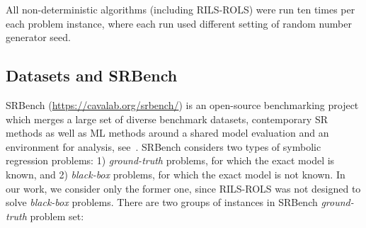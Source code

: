 \documentclass[a4paper,12pt]{elsarticle}
\begin{document}
All non-deterministic algorithms (including \textsc{RILS}-\textsc{ROLS}) were run ten times per each problem instance, where each run used different setting of random number generator seed. 

\subsection{Datasets and SRBench}

SRBench (\url{https://cavalab.org/srbench/}) is an open-source benchmarking project which merges a large set of diverse benchmark datasets, contemporary SR methods as well as ML methods around a shared model evaluation and an environment for analysis, see~\cite{la2021contemporary}. SRBench considers two types of symbolic regression problems: 1) \emph{ground-truth} problems, for which the exact model is known, and 2) \emph{black-box} problems, for which the exact model is not known. In our work, we consider only the former one, since \textsc{RILS-ROLS} was not designed to solve \emph{black-box} problems. There are two groups of instances in SRBench \emph{ground-truth} problem set:
\end{document}

